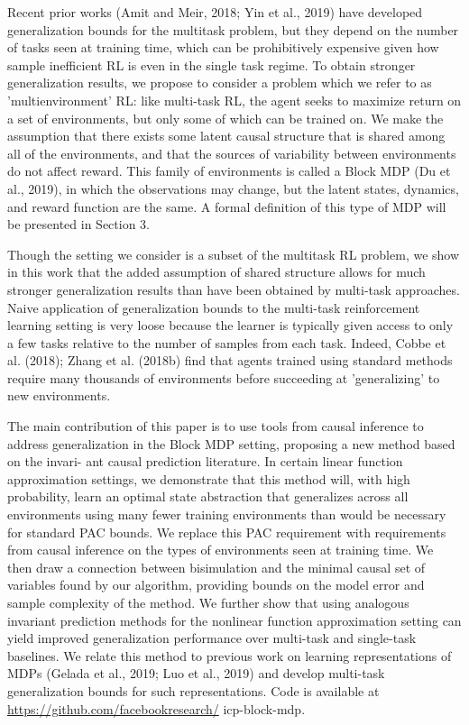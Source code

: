 \documentclass[10pt]{article}
\begin{document}
Recent prior works (Amit and Meir, 2018; Yin et al., 2019) have developed generalization bounds for the multitask problem, but they depend on the number of tasks seen at training time, which can be prohibitively expensive given how sample inefficient RL is even in the single task regime. To obtain stronger generalization results, we propose to consider a problem which we refer to as 'multienvironment' RL: like multi-task RL, the agent seeks to maximize return on a set of environments, but only some of which can be trained on. We make the assumption that there exists some latent causal structure that is shared among all of the environments, and that the sources of variability between environments do not affect reward. This family of environments is called a Block MDP (Du et al., 2019), in which the observations may change, but the latent states, dynamics, and reward function are the same. A formal definition of this type of MDP will be presented in Section 3.

Though the setting we consider is a subset of the multitask RL problem, we show in this work that the added assumption of shared structure allows for much stronger generalization results than have been obtained by multi-task approaches. Naive application of generalization bounds to the multi-task reinforcement learning setting is very loose because the learner is typically given access to only a few tasks relative to the number of samples from each task. Indeed, Cobbe et al. (2018); Zhang et al. (2018b) find that agents trained using standard methods require many thousands of environments before succeeding at 'generalizing' to new environments.

The main contribution of this paper is to use tools from causal inference to address generalization in the Block MDP setting, proposing a new method based on the invari- ant causal prediction literature. In certain linear function approximation settings, we demonstrate that this method will, with high probability, learn an optimal state abstraction that generalizes across all environments using many fewer training environments than would be necessary for standard PAC bounds. We replace this PAC requirement with requirements from causal inference on the types of environments seen at training time. We then draw a connection between bisimulation and the minimal causal set of variables found by our algorithm, providing bounds on the model error and sample complexity of the method. We further show that using analogous invariant prediction methods for the nonlinear function approximation setting can yield improved generalization performance over multi-task and single-task baselines. We relate this method to previous work on learning representations of MDPs (Gelada et al., 2019; Luo et al., 2019) and develop multi-task generalization bounds for such representations. Code is available at \href{https://github.com/facebookresearch/}{https://github.com/facebookresearch/} icp-block-mdp.
\end{document}
